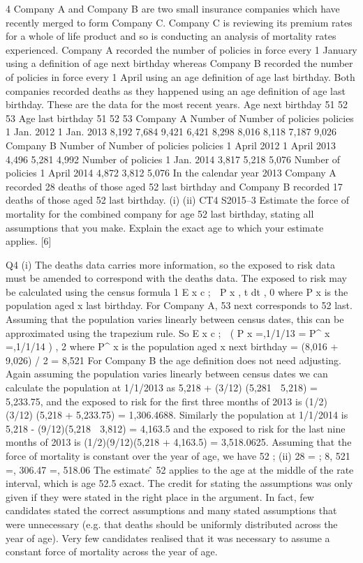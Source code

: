 \documentclass[a4paper,12pt]{article}
\begin{document}
4
Company A and Company B are two small insurance companies which have recently
merged to form Company C. Company C is reviewing its premium rates for a whole
of life product and so is conducting an analysis of mortality rates experienced.
Company A recorded the number of policies in force every 1 January using a
definition of age next birthday whereas Company B recorded the number of policies
in force every 1 April using an age definition of age last birthday. Both companies
recorded deaths as they happened using an age definition of age last birthday.
These are the data for the most recent years.
Age next
birthday
51
52
53
Age last
birthday
51
52
53
Company A
Number of
Number of
policies
policies
1 Jan. 2012
1 Jan. 2013
8,192
7,684
9,421
6,421
8,298
8,016
8,118
7,187
9,026
Company B
Number of
Number of
policies
policies
1 April 2012
1 April 2013
4,496
5,281
4,992
Number of
policies
1 Jan. 2014
3,817
5,218
5,076
Number of
policies
1 April 2014
4,872
3,812
5,076
In the calendar year 2013 Company A recorded 28 deaths of those aged 52 last
birthday and Company B recorded 17 deaths of those aged 52 last birthday.
(i)
(ii)
CT4 S2015–3
Estimate the force of mortality for the combined company for age 52 last
birthday, stating all assumptions that you make.
Explain the exact age to which your estimate applies.
[6]

\newpage

Q4
(i)
The deaths data carries more information, so the exposed to risk data must be
amended to correspond with the deaths data.
The exposed to risk may be calculated using the census formula
1
E x c ;\+\;  P x , t dt ,
0
where P x is the population aged x last birthday.
For Company A, 53 next corresponds to 52 last.
Assuming that the population varies linearly between census dates, this can be
approximated using the trapezium rule.
So E x c ;\+ 
( P x \;=,1/1/13 \;=\; P^{\ast} x \;=,1/1/14 ) ,
2
where P^{\ast} x is the population aged x next birthday
= (8,016 + 9,026) / 2
= 8,521
For Company B the age definition does not need adjusting.
Again assuming the population varies linearly between census dates we can
calculate the population at 1/1/2013 as
5,218 + (3/12) (5,281  5,218) = 5,233.75,
and the exposed to risk for the first three months of 2013 is
(1/2) (3/12) (5,218 + 5,233.75) = 1,306.4688.
Similarly the population at 1/1/2014 is
5,218 - (9/12)(5,218  3,812) = 4,163.5
and the exposed to risk for the last nine months of 2013 is
(1/2)(9/12)(5,218 + 4,163.5) = 3,518.0625.
Assuming that the force of mortality is constant over the year of age,
we have \hat{\mu} 52 ;\+\;
(ii)
28 \;=
;\+
8, 521 \;=, 306.47 \;=, 518.06
The estimate \mû 52 applies to the age at the middle of the rate interval, which is
age 52.5 exact.
The credit for stating the assumptions was only given if they were stated in
the right place in the argument. In fact, few candidates stated the correct
assumptions and many stated assumptions that were unnecessary (e.g. that
deaths should be uniformly distributed across the year of age). Very few
candidates realised that it was necessary to assume a constant force of
mortality across the year of age.
\end{document}
